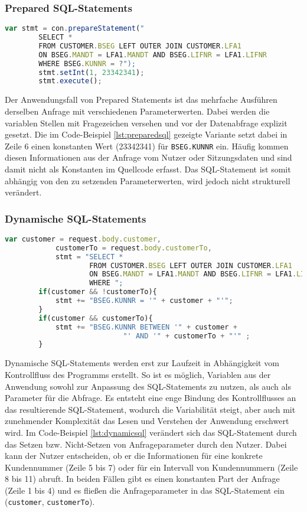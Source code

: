 \subsubsection{Prepared SQL-Statements}

	\begin{lstlisting}[caption={Prepared Statements eingebettet im Quellcode}, label={lst:preparedsql}, language=JavaScript]
		var stmt = con.prepareStatement("
		SELECT *
		FROM CUSTOMER.BSEG LEFT OUTER JOIN CUSTOMER.LFA1
		ON BSEG.MANDT = LFA1.MANDT AND BSEG.LIFNR = LFA1.LIFNR
		WHERE BSEG.KUNNR = ?");
		stmt.setInt(1, 23342341);
		stmt.execute();
	\end{lstlisting}

Der Anwendungsfall von Prepared Statements ist das mehrfache Ausführen derselben Anfrage mit verschiedenen Parameterwerten.
Dabei werden die variablen Stellen mit Fragezeichen versehen und vor der Datenabfrage explizit gesetzt.
Die im Code-Beispiel \ref{lst:preparedsql} gezeigte Variante setzt dabei in Zeile 6 einen konstanten Wert (23342341) für \texttt{BSEG.KUNNR} ein.
Häufig kommen diesen Informationen aus der Anfrage vom Nutzer oder Sitzungsdaten und sind damit nicht als Konstanten im Quellcode erfasst.
Das SQL-Statement ist somit abhängig von den zu setzenden Parameterwerten, wird jedoch nicht strukturell verändert.

\subsubsection{Dynamische SQL-Statements}

	\begin{lstlisting}[caption={Der Kontrollfluss verändert dynamische SQL-Statements}, label={lst:dynamicsql}, language=JavaScript]
		var customer = request.body.customer,
		    customerTo = request.body.customerTo,
		    stmt = "SELECT *
					FROM CUSTOMER.BSEG LEFT OUTER JOIN CUSTOMER.LFA1
					ON BSEG.MANDT = LFA1.MANDT AND BSEG.LIFNR = LFA1.LIFNR
					WHERE ";
		if(customer && !customerTo){
			stmt += "BSEG.KUNNR = '" + customer + "'";
		}
		if(customer && customerTo){
			stmt += "BSEG.KUNNR BETWEEN '" + customer +
							"' AND '" + customerTo + "'" ;
		}
	\end{lstlisting}

Dynamische SQL-Statements werden erst zur Laufzeit in Abhängigkeit vom Kontrollfluss des Programms erstellt.
So ist es möglich, Variablen aus der Anwendung sowohl zur Anpassung des SQL-Statements zu nutzen, als auch als Parameter für die Abfrage.
Es entsteht eine enge Bindung des Kontrollflusses an das resultierende SQL-Statement, wodurch die Variabilität steigt, aber auch mit zunehmender Komplexität das Lesen und Verstehen der Anwendung erschwert wird.
Im Code-Beispiel \ref{lst:dynamicsql} verändert sich das SQL-Statement durch das Setzen bzw. Nicht-Setzen von Anfrageparameter durch den Nutzer.
Dabei kann der Nutzer entscheiden, ob er die Informationen für eine konkrete Kundennummer (Zeile 5 bis 7) oder für ein Intervall von Kundennummern (Zeile 8 bis 11) abruft.
In beiden Fällen gibt es einen konstanten Part der Anfrage (Zeile 1 bis 4) und es fließen die Anfrageparameter in das SQL-Statement ein (\texttt{customer}, \texttt{customerTo}).

